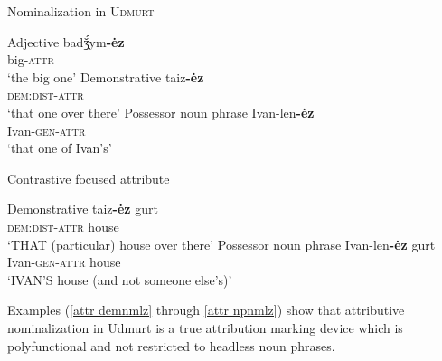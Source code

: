 \begin{exe}
\ex Nominalization in \textsc{Udmurt} \citep{winkler2001}
\begin{xlist}
\ex Adjective 
\gll	badǯ́ym\textbf{-ėz}\\
	big-\textsc{attr}\\
\glt	 ‘the big one’
\ex Demonstrative
\gll	taiz\textbf{-ėz}\\
 	\textsc{dem:dist}-\textsc{attr}\\
\glt	‘that one over there’
\ex Possessor noun phrase
\gll	Ivan-len\textbf{-ėz}\\
	Ivan-\textsc{gen}-\textsc{attr}\\
	 ‘that one of Ivan's’
\end{xlist}
\ex Contrastive focused attribute
\begin{xlist}
\ex Demonstrative \label{attr demnmlz}
\gll	taiz\textbf{-ėz} gurt\\
 	\textsc{dem:dist}-\textsc{attr} house\\
\glt	‘THAT (particular) house over there’
\ex Possessor noun phrase \label{attr npnmlz}
\gll	Ivan-len\textbf{-ėz} gurt\\
	Ivan-\textsc{gen}-\textsc{attr} house\\
	 ‘IVAN'S house (and not someone else's)’
\end{xlist}
\end{exe}
Examples (\ref{attr demnmlz} through \ref{attr npnmlz}) show that attributive nominalization in Udmurt is a true attribution marking device which is polyfunctional and not restricted to headless noun phrases.

